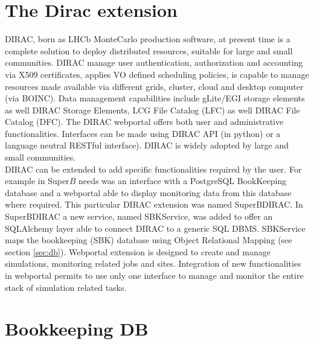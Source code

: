 \documentclass[a4paper]{jpconf}
\begin{document}
\section{The Dirac extension} 
DIRAC, born as LHCb MonteCarlo production software, at present time is a complete solution to deploy distributed resources, suitable for large and small communities. DIRAC manage user authentication, authorization and accounting via X509 certificates, applies VO defined scheduling policies, is capable to manage resources made available via different grids, cluster, cloud and desktop computer (via BOINC). Data management capabilities include gLite/EGI storage elements as well DIRAC Storage Elements, LCG File Catalog (LFC) as well DIRAC File Catalog (DFC). The DIRAC webportal offers both user and administrative functionalities. Interfaces can be made using DIRAC API (in python) or a language neutral RESTful interface). DIRAC is widely adopted by large and small communities.\\
DIRAC can be extended to add specific functionalities required by the user. For example in Super$B$\cite{ref:superb_tdr} needs was an interface with a PostgreSQL BookKeeping database and a webportal able to display monitoring data from this database where required. This particular DIRAC extension was named SuperBDIRAC.
In SuperBDIRAC a new service, named SBKService, was added to offer an SQLAlchemy layer able to connect DIRAC to a generic SQL DBMS. SBKService maps the bookkeeping (SBK) database using Object Relational Mapping (see section \ref{sec:db}). 
Webportal extension is designed to create and manage simulations, monitoring related jobs and sites. Integration of new functionalities in webportal permits to use only one interface to manage and monitor the entire stack of simulation related tasks.

\section{Bookkeeping DB}
\label{sec:sbk}
\end{document}
